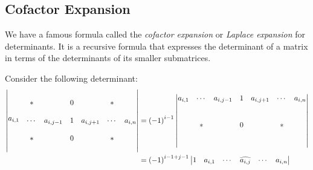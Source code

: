
\subsection{Cofactor Expansion}
We have a famous formula called the \emph{cofactor expansion} or \emph{Laplace expansion} for determinants. It is a recursive formula that expresses the determinant of a matrix in terms of the determinants of its smaller submatrices.

Consider the following determinant:
\vspace{6ex}
\begin{align*}
  \begin{vmatrix}
                          &        &           &                                                \\
                          & *      &           & \point{jcol}{0} &           & *      &         \\
    \\
    \point{irow}{a_{i,1}} & \cdots & a_{i,j-1} & 1               & a_{i,j+1} & \cdots & a_{i,n} \\
    \\
                          & *      &           & 0               &           & *      &         \\
    \\
  \end{vmatrix} & = {(-1)}^{i - 1} \begin{vmatrix}
                                     a_{i,1} & \cdots & a_{i,j-1} & 1 & a_{i,j+1} & \cdots & a_{i,n} \\
                                     \\ \\
                                             & *      &           & 0 &           & *      &         \\
                                     \\ \\
                                   \end{vmatrix}                                                                                                                  \\
                                                                                                                        & = {(-1)}^{i - 1 + j - 1} \begin{vmatrix}
                                                                                                                                                     1 & a_{i,1} & \cdots & \widehat{a_{i,j}} & \cdots & a_{i,n} \\

\end{vmatrix}
\end{align*}
